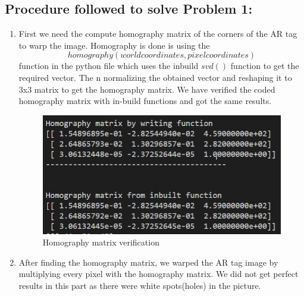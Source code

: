 \documentclass[12pt]{article}
\begin{document}
\subsection{Procedure followed to solve Problem 1:}
\begin{enumerate}
\item First we need the compute homography matrix of the corners of the AR tag to warp the image. Homography is done is using the
\begin{equation}
homography(worldcoordinates, pixelcoordinates)
\end{equation}
function in the python file which uses the inbuild $svd()$ function to get the required vector. The n normalizing the obtained vector and reshaping it to 3x3 matrix to get the homography matrix.
We have verified the coded homography matrix with in-build functions and got the same results.
\begin{figure}[h]
    \centering
    \includegraphics[width=12cm]{homography}
    \caption{Homography matrix verification}
    \label{fig:homography}
\end{figure}

\item After finding the homography matrix, we warped the AR tag image by multiplying every pixel with the homography matrix. We did not get perfect results in this part as there were white spots(holes) in the picture. 


\end{enumerate}
\end{document}
